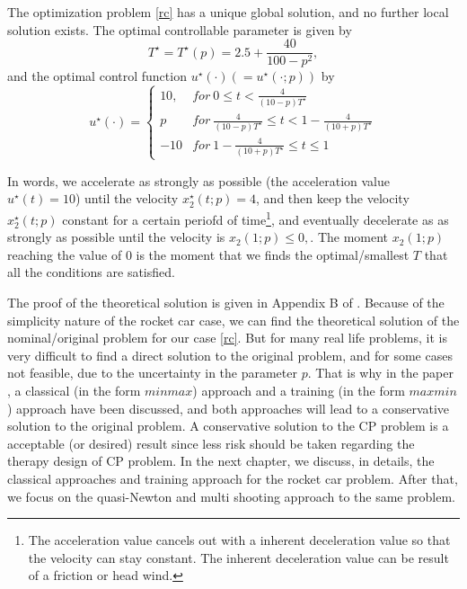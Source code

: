 	
	
	The optimization problem \ref{rc} has a unique global solution, and no further local solution exists. The optimal controllable parameter is given by 
	\begin{equation}
		T^\star = T^\star(p) = 2.5 + \frac{40}{100-p^2},
	\end{equation}
	and the optimal control function $u^\star(\cdot) (= u^\star(\cdot; p))$ by 
	\begin{equation}
		u^\star(\cdot) =     \left\{
		\begin{array}{ll}
			10, & for \  0 \leq t <  \frac{4}{(10-p)T^\star}\\
			p  &  for \ \frac{4}{(10-p)T^\star} \leq t < 1- \frac{4}{(10+p)T^\star} \\
			-10  & for \  1- \frac{4}{(10+p)T^\star} \leq t \leq 1 
		\end{array}
		\right.
	\end{equation}
	
	In words, we accelerate as strongly as possible (the acceleration value $u^\star(t)=10$) until the velocity $x^\star_2(t;p)=4$, and then keep the velocity $x^\star_2(t;p)$ constant for a certain periofd of time\footnote{The acceleration value cancels out with a inherent deceleration value so that the velocity can stay constant. The inherent deceleration value can be result of a friction or head wind.}, and eventually decelerate as as strongly as possible until the velocity is $x_2(1;p) \leq 0, \label{rc_x2_t1}$. The moment $x_2(1;p)$ reaching the value of $0$ is the moment that we finds the optimal/smallest $T$ that all the conditions are satisfied. 
	
	The proof of the theoretical solution is given in Appendix B of \cite{MatSch22}. Because of the simplicity nature of the rocket car case, we can find the theoretical solution of the nominal/original problem for our case \ref{rc}. But for many real life problems, it is very difficult to find a direct solution to the original problem, and for some cases not feasible, due to the uncertainty in the parameter $p$. That is why in the paper \cite{MatSch22}, a classical (in the form $minmax$) approach and a training (in the form $maxmin$) approach have been discussed, and both approaches will lead to a conservative solution to the original problem. A conservative solution to the CP problem is a acceptable (or desired) result since less risk should be taken regarding the therapy design of CP problem. In the next chapter, we discuss, in details, the classical approaches and training approach for the rocket car problem. After that, we focus on the quasi-Newton and multi shooting approach to the same problem.  
	
